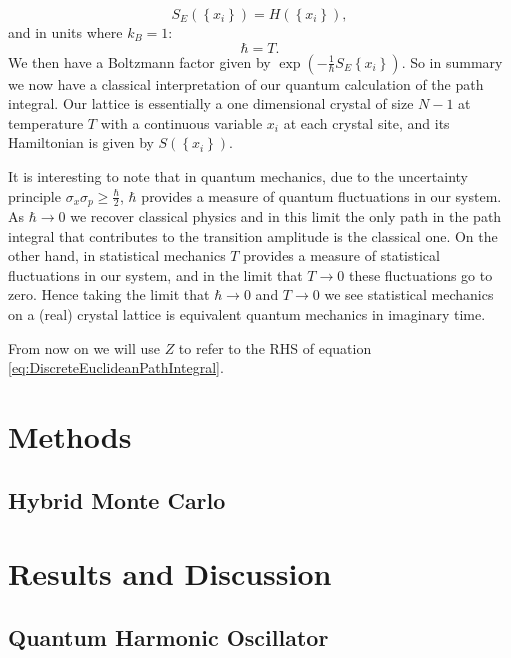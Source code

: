 \documentclass[12pt]{article}
\begin{document}
\begin{equation}
	\label{ActionToHamiltonian}
	S_{E}\left(\left\{x_{i}\right\}\right) = H\left(\left\{x_{i}\right\}\right),
\end{equation}
and in units where $k_{B} = 1$:
\begin{equation}
	\label{PlankToBoltzman}
	\hbar = T.
\end{equation}
We then have a Boltzmann factor given by $\exp{\left(-\frac{1}{\hbar}S_{E}\left\{x_{i}\right\}\right)}$. So in summary we now have a classical interpretation of our quantum calculation of the path integral. Our lattice is essentially a one dimensional crystal of size $N-1$ at temperature $T$ with a continuous variable $x_i$ at each crystal site, and its Hamiltonian is given by $S\left(\left\{x_i\right\}\right)$.

It is interesting to note that in quantum mechanics, due to the uncertainty principle $\sigma_x\sigma_p \geq \frac{\hbar}{2}$, $\hbar$ provides a measure of quantum fluctuations in our system. As $\hbar \rightarrow 0$ we recover classical physics and in this limit the only path in the path integral that contributes to the transition amplitude is the classical one. On the other hand, in statistical mechanics $T$ provides a measure of statistical fluctuations in our system, and in the limit that $T \rightarrow 0$ these fluctuations go to zero. Hence taking the limit that $\hbar \rightarrow 0$ and $T \rightarrow 0$ we see statistical mechanics on a (real) crystal lattice is equivalent quantum mechanics in imaginary time.

From now on we will use $Z$ to refer to the RHS of equation \ref{eq:DiscreteEuclideanPathIntegral}.

\section{Methods}
\subsection{Hybrid Monte Carlo}


\section{Results and Discussion}
\subsection{Quantum Harmonic Oscillator}
\end{document}
